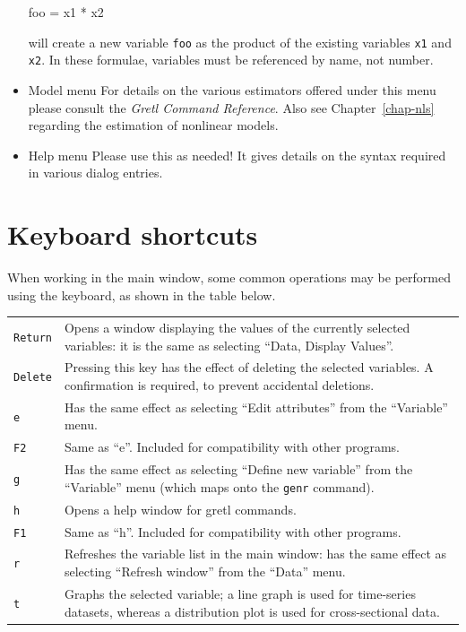 \begin{itemize}
\begin{code} 
foo = x1 * x2
\end{code}

  will create a new variable \verb+foo+ as the product of the existing
  variables \verb+x1+ and \verb+x2+.  In these formulae, variables
  must be referenced by name, not number.

\item \textsf{Model menu} For details on the various estimators
  offered under this menu please consult the \emph{Gretl Command
    Reference}.  Also see Chapter~\ref{chap-nls} regarding the
  estimation of nonlinear models.

\item \textsf{Help menu} Please use this as needed! It gives details
  on the syntax required in various dialog entries.
\end{itemize}


\section{Keyboard shortcuts}
\label{keyb-accel}

When working in the main  window, some common operations
may be performed using the keyboard, as shown in the table below.

\begin{center}
\begin{tabular}{lp{5in}}
  \texttt{Return} & Opens a window displaying the values of the currently
  selected variables: it is the same as selecting ``Data, Display
  Values''. \\
  \texttt{Delete} & Pressing this key has the effect of deleting the
  selected variables. A confirmation is required, to prevent
  accidental deletions. \\
  \texttt{e} & Has the same effect as selecting ``Edit
  attributes'' from the ``Variable'' menu. \\
  \texttt{F2} & Same as ``e''. Included for compatibility with other
  programs.\\
  \texttt{g} & Has the same effect as selecting ``Define new
  variable'' from the ``Variable'' menu (which maps onto the
  \texttt{genr} command).\\
  \texttt{h} & Opens a help window for gretl commands.\\
  \texttt{F1} & Same as ``h''. Included for compatibility with other
  programs.\\
  \texttt{r} & Refreshes the variable list in the main window: has 
  the same effect as selecting ``Refresh window'' from the ``Data'' menu. \\
  \texttt{t} & Graphs the selected variable; a line graph is used for
  time-series datasets, whereas a distribution plot is used for
  cross-sectional data. 
\end{tabular}
\end{center}

